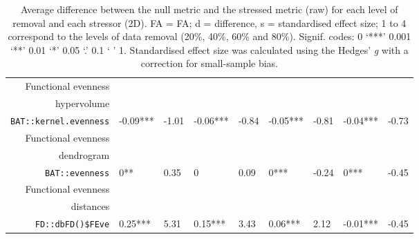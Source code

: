 \begin{table}[ht]
\begin{tabular}{rllllllll}
  Functional evenness\\ hypervolume\\ \texttt{BAT::kernel.evenness} & -0.09*** & -1.01 & -0.06*** & -0.84 & -0.05*** & -0.81 & -0.04*** & -0.73 \\ 
  Functional evenness\\ dendrogram\\ \texttt{BAT::evenness} & 0** & 0.35 & 0 & 0.09 & 0*** & -0.24 & 0*** & -0.45 \\ 
  Functional evenness\\ distances\\ \texttt{FD::dbFD()\$FEve} & 0.25*** & 5.31 & 0.15*** & 3.43 & 0.06*** & 2.12 & -0.01*** & -0.45 \\ 
   \hline
\end{tabular}
\caption{Average difference between the null metric and the stressed metric (raw) for each level of removal and each stressor (2D). FA = FA; d = difference, s = standardised effect size; 1 to 4 correspond to the levels of data removal (20\%, 40\%, 60\% and 80\%). Signif. codes:  0 ‘***’ 0.001 ‘**’ 0.01 ‘*’ 0.05 ‘.’ 0.1 ‘ ’ 1. Standardised effect size was calculated using the Hedges' \textit{g} with a correction for small-sample bias.} 
\end{table}
